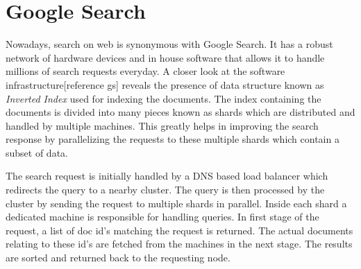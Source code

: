 \documentclass[12pt,a4paper,twoside,openright]{book}
\begin{document}
\section{Google Search}
Nowadays, search on web is synonymous with Google Search. It has a robust network of hardware devices and in house software that allows it to handle millions of search requests everyday. A closer look at the software infrastructure[reference gs] reveals the presence of data structure known as \textit{Inverted Index} used for indexing the documents. The index containing the documents is divided into many pieces known as shards which are distributed and handled by multiple machines. This greatly helps in improving the search response by parallelizing the requests to these multiple shards which contain a subset of data. 
\par The search request is initially handled by a DNS based load balancer which redirects the query to a nearby cluster. The query is then processed by the cluster by sending the request to multiple shards in parallel. Inside each shard a dedicated machine is responsible for handling queries. In first stage of the request, a list of doc id's matching the request is returned. The actual documents relating to these id's are fetched from the machines in the next stage. The results are sorted and returned back to the requesting node.
\end{document}
